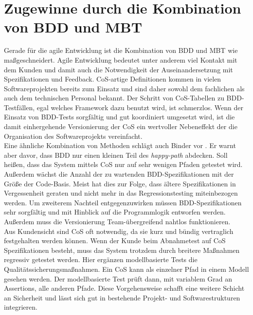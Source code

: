 \section{Zugewinne durch die Kombination von BDD und MBT}
Gerade für die agile Entwicklung ist die Kombination von BDD und \Gls{MBT} wie maßgeschneidert. Agile Entwicklung bedeutet unter anderem viel Kontakt mit dem Kunden und damit auch die Notwendigkeit der Auseinandersetzung mit Spezifikationen und Feedback. CoS-artige Definitionen kommen in vielen Softwareprojekten bereits zum Einsatz und sind daher sowohl dem fachlichen als auch dem technischen Personal bekannt. Der Schritt von CoS-Tabellen zu BDD-Testfällen, egal welches Framework dazu benutzt wird, ist schmerzlos. Wenn der Einsatz von BDD-Tests sorgfältig und gut koordiniert umgesetzt wird, ist die damit einhergehende Versionierung der CoS ein wertvoller Nebeneffekt der die Organisation des Softwareprojekts vereinfacht.\\
Eine ähnliche Kombination von Methoden schlägt auch Binder vor \cite{binder_model-based_2014}. Er warnt aber davor, dass BDD nur einen kleinen Teil des \textit{happy-path} abdecken. Soll heißen, dass das System mittels CoS nur auf sehr wenigen Pfaden getestet wird. Außerdem wächst die Anzahl der zu wartenden BDD-Spezifikationen mit der Größe der Code-Basis. Meist hat dies zur Folge, dass ältere Spezifikationen in Vergessenheit geraten und nicht mehr in das Regressionstesting miteinbezogen werden. Um zweiterem Nachteil entgegenzuwirken müssen BDD-Spezifikationen sehr sorgfältig und mit Hinblick auf die Programmlogik entworfen werden. Außerdem muss die Versionierung Team-übergreifend nahtlos funktionieren.\\
Aus Kundensicht sind CoS oft notwendig, da sie kurz und bündig vertraglich festgehalten werden können. Wenn der Kunde beim Abnahmetest auf CoS Spezifikationen besteht, muss das System trotzdem durch breitere Maßnahmen regressiv getestet werden. Hier ergänzen modellbasierte Tests die Qualitätssicherungsmaßnahmen. Ein CoS kann als einzelner Pfad in einem Modell gesehen werden. Der modellbasierte Test prüft dann, mit variablem Grad an Assertions, alle anderen Pfade. Diese Vorgehensweise schafft eine weitere Schicht an Sicherheit und lässt sich gut in bestehende Projekt- und Softwarestrukturen integrieren.













